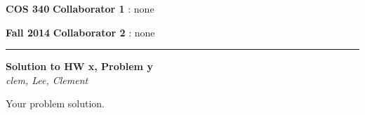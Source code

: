 \documentclass[12pt]{article}
\newcommand{\myheader}[4]
{\vspace*{-0.5in}
\noindent
{#1} \hfill {#3}

\noindent
{#2} \hfill {#4}

\noindent
\rule[8pt]{\textwidth}{1pt}

\vspace{1ex} 
}  %
\newcommand{\myalgsheader}[0]
{\myheader
{ {\bf{COS 340}} }
{ {\bf{Fall 2014}} }
{ {\bf{Collaborator 1}} : none}
{ {\bf{Collaborator 2}} : none}
}
\newcommand{\myhwtitle}[3]
{\begin{center}
{\large {\bf Solution to HW {#1}, Problem {#2}}}\\
\medskip 
{\it {#3}} %
\end{center}}
\begin{document}
\myalgsheader

\pagestyle{plain}

\myhwtitle{x}{y}{clem, Lee, Clement}

\bigskip

Your problem solution.
\end{document}
